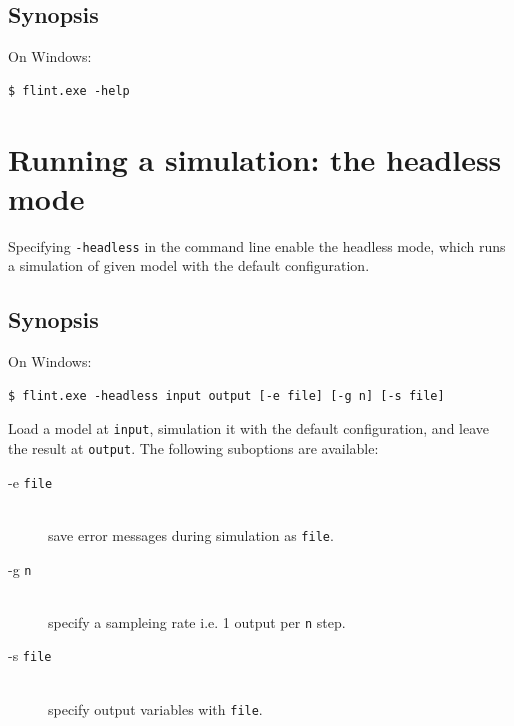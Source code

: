 \documentclass[a4paper,10pt]{report}
\begin{document}
\subsection{Synopsis}
On Windows:
\begin{verbatim}
$ flint.exe -help
\end{verbatim}

\section{Running a simulation: the headless mode}
Specifying {\tt -headless} in the command line enable the headless mode, which
runs a simulation of given model with the default configuration.

\subsection{Synopsis}
On Windows:
\begin{verbatim}
$ flint.exe -headless input output [-e file] [-g n] [-s file]
\end{verbatim}
Load a model at {\tt input}, simulation it with the default configuration,
and leave the result at {\tt output}.
The following suboptions are available:
\begin{description}
\item[-e {\tt file}] \hfill \\
  save error messages during simulation as {\tt file}.
\item[-g {\tt n}] \hfill \\
  specify a sampleing rate i.e. 1 output per {\tt n} step.
\item[-s {\tt file}] \hfill \\
  specify output variables with {\tt file}.
\end{description}
\end{document}
